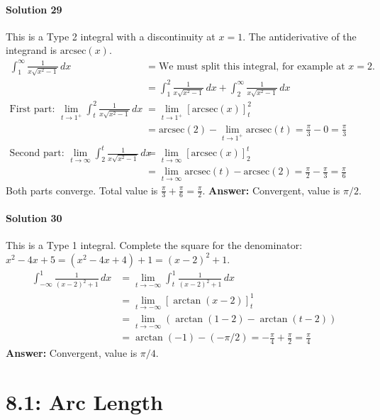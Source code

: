 \documentclass{article}
\begin{document}
\subsection*{Solution 29}
This is a Type 2 integral with a discontinuity at $x=1$. The antiderivative of the integrand is $\text{arcsec}(x)$.
\begin{align*}
\int_{1}^{\infty} \frac{1}{x\sqrt{x^2-1}} \,dx &= \text{We must split this integral, for example at } x=2. \\
&= \int_{1}^{2} \frac{1}{x\sqrt{x^2-1}} \,dx + \int_{2}^{\infty} \frac{1}{x\sqrt{x^2-1}} \,dx \\
\text{First part: } \lim_{t \to 1^+} \int_{t}^{2} \frac{1}{x\sqrt{x^2-1}} \,dx &= \lim_{t \to 1^+} [\text{arcsec}(x)]_{t}^{2} \\
&= \text{arcsec}(2) - \lim_{t \to 1^+} \text{arcsec}(t) = \frac{\pi}{3} - 0 = \frac{\pi}{3} \\
\text{Second part: } \lim_{t \to \infty} \int_{2}^{t} \frac{1}{x\sqrt{x^2-1}} \,dx &= \lim_{t \to \infty} [\text{arcsec}(x)]_{2}^{t} \\
&= \lim_{t \to \infty} \text{arcsec}(t) - \text{arcsec}(2) = \frac{\pi}{2} - \frac{\pi}{3} = \frac{\pi}{6}
\end{align*}
Both parts converge. Total value is $\frac{\pi}{3} + \frac{\pi}{6} = \frac{\pi}{2}$.
\textbf{Answer:} Convergent, value is $\pi/2$.

\subsection*{Solution 30}
This is a Type 1 integral. Complete the square for the denominator: $x^2-4x+5 = (x^2-4x+4)+1 = (x-2)^2+1$.
\begin{align*}
\int_{-\infty}^{1} \frac{1}{(x-2)^2+1} \,dx &= \lim_{t \to -\infty} \int_{t}^{1} \frac{1}{(x-2)^2+1} \,dx \\
&= \lim_{t \to -\infty} [\arctan(x-2)]_{t}^{1} \\
&= \lim_{t \to -\infty} (\arctan(1-2) - \arctan(t-2)) \\
&= \arctan(-1) - (-\pi/2) = -\frac{\pi}{4} + \frac{\pi}{2} = \frac{\pi}{4}
\end{align*}
\textbf{Answer:} Convergent, value is $\pi/4$.

\part*{8.1: Arc Length}
\end{document}
